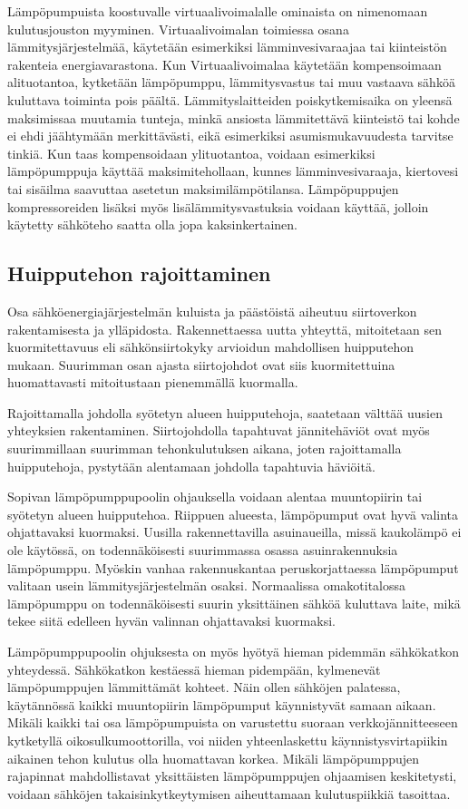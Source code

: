   Lämpöpumpuista koostuvalle virtuaalivoimalalle ominaista on nimenomaan kulutusjouston myyminen. Virtuaalivoimalan toimiessa osana lämmitysjärjestelmää, käytetään esimerkiksi lämminvesivaraajaa tai kiinteistön rakenteia energiavarastona. Kun Virtuaalivoimalaa käytetään kompensoimaan alituotantoa, kytketään lämpöpumppu, lämmitysvastus tai muu vastaava sähköä kuluttava toiminta pois päältä. Lämmityslaitteiden poiskytkemisaika on yleensä maksimissaa muutamia tunteja, minkä ansiosta lämmitettävä kiinteistö tai kohde ei ehdi jäähtymään merkittävästi, eikä esimerkiksi asumismukavuudesta tarvitse tinkiä. Kun taas kompensoidaan ylituotantoa, voidaan esimerkiksi lämpöpumppuja käyttää maksimitehollaan, kunnes lämminvesivaraaja, kiertovesi tai sisäilma saavuttaa asetetun maksimilämpötilansa. Lämpöpuppujen kompressoreiden lisäksi myös lisälämmitysvastuksia voidaan käyttää, jolloin käytetty sähköteho saatta olla jopa kaksinkertainen.

\subsection{Huipputehon rajoittaminen}

  Osa sähköenergiajärjestelmän kuluista ja päästöistä aiheutuu siirtoverkon rakentamisesta ja ylläpidosta. Rakennettaessa uutta yhteyttä, mitoitetaan sen kuormitettavuus eli sähkönsiirtokyky arvioidun mahdollisen huipputehon mukaan. Suurimman osan ajasta siirtojohdot ovat siis kuormitettuina huomattavasti mitoitustaan pienemmällä kuormalla.

  Rajoittamalla johdolla syötetyn alueen huipputehoja, saatetaan välttää uusien yhteyksien rakentaminen. Siirtojohdolla tapahtuvat jännitehäviöt ovat myös suurimmillaan suurimman tehonkulutuksen aikana, joten rajoittamalla huipputehoja, pystytään alentamaan johdolla tapahtuvia häviöitä.

  Sopivan lämpöpumppupoolin ohjauksella voidaan alentaa muuntopiirin tai syötetyn alueen huipputehoa. Riippuen alueesta, lämpöpumput ovat hyvä valinta ohjattavaksi kuormaksi. Uusilla rakennettavilla asuinaueilla, missä kaukolämpö ei ole käytössä, on todennäköisesti suurimmassa osassa asuinrakennuksia lämpöpumppu. Myöskin vanhaa rakennuskantaa peruskorjattaessa lämpöpumput valitaan usein lämmitysjärjestelmän osaksi. Normaalissa omakotitalossa lämpöpumppu on todennäköisesti suurin yksittäinen sähköä kuluttava laite, mikä tekee siitä edelleen hyvän valinnan ohjattavaksi kuormaksi.

  Lämpöpumppupoolin ohjuksesta on myös hyötyä hieman pidemmän sähkökatkon yhteydessä. Sähkökatkon kestäessä hieman pidempään, kylmenevät lämpöpumppujen lämmittämät kohteet. Näin ollen sähköjen palatessa, käytännössä kaikki muuntopiirin lämpöpumput käynnistyvät samaan aikaan. Mikäli kaikki tai osa lämpöpumpuista on varustettu suoraan verkkojännitteeseen kytketyllä oikosulkumoottorilla, voi niiden yhteenlaskettu käynnistysvirtapiikin aikainen tehon kulutus olla huomattavan korkea. Mikäli lämpöpumppujen rajapinnat mahdollistavat yksittäisten lämpöpumppujen ohjaamisen keskitetysti, voidaan sähköjen takaisinkytkeytymisen aiheuttamaan kulutuspiikkiä tasoittaa.

